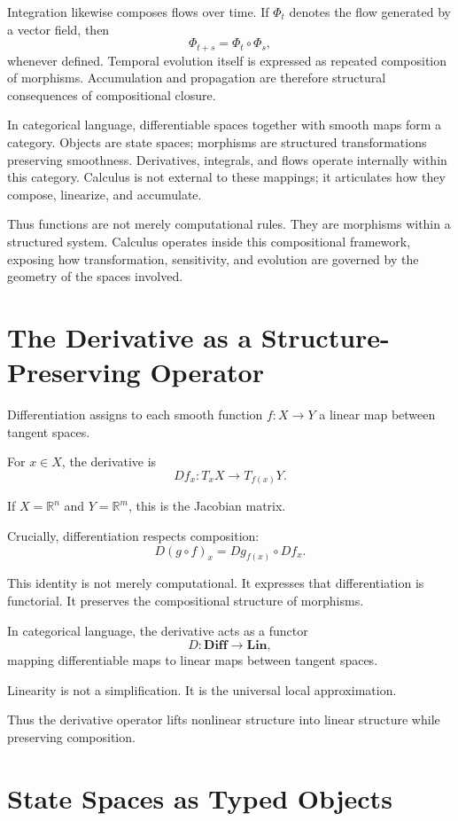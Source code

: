 \documentclass[12pt]{book}
\begin{document}
Integration likewise composes flows over time. If $\Phi_t$ denotes
the flow generated by a vector field, then
\[
\Phi_{t+s} = \Phi_t \circ \Phi_s,
\]
whenever defined. Temporal evolution itself is expressed as repeated
composition of morphisms. Accumulation and propagation are therefore
structural consequences of compositional closure.

In categorical language, differentiable spaces together with smooth
maps form a category. Objects are state spaces; morphisms are
structured transformations preserving smoothness. Derivatives,
integrals, and flows operate internally within this category.
Calculus is not external to these mappings; it articulates how they
compose, linearize, and accumulate.

Thus functions are not merely computational rules. They are morphisms
within a structured system. Calculus operates inside this compositional
framework, exposing how transformation, sensitivity, and evolution are
governed by the geometry of the spaces involved.

\section{The Derivative as a Structure-Preserving Operator}

Differentiation assigns to each smooth function $f : X \to Y$ a linear map between tangent spaces.

For $x \in X$, the derivative is
\[
Df_x : T_x X \to T_{f(x)} Y.
\]

If $X = \mathbb{R}^n$ and $Y = \mathbb{R}^m$, this is the Jacobian matrix.

Crucially, differentiation respects composition:
\[
D(g \circ f)_x
=
Dg_{f(x)} \circ Df_x.
\]

This identity is not merely computational. It expresses that differentiation is functorial. It preserves the compositional structure of morphisms.

In categorical language, the derivative acts as a functor
\[
D : \mathbf{Diff} \to \mathbf{Lin},
\]
mapping differentiable maps to linear maps between tangent spaces.

Linearity is not a simplification. It is the universal local approximation.

Thus the derivative operator lifts nonlinear structure into linear structure while preserving composition.

\section{State Spaces as Typed Objects}
\end{document}
